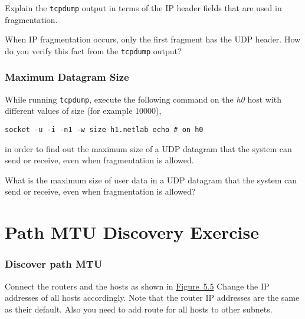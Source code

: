 \documentclass{../UTNetLab}
\begin{document}
    \begin{report}
        \item Explain the \lstinline{tcpdump} output in terms of the IP header fields that are used in fragmentation.

        \item When IP fragmentation occurs, only the first fragment has the UDP header.
    How do you verify this fact from the \lstinline{tcpdump} output?
    \end{report}


\section{Maximum Datagram Size}
\label{sec:MaxDatagramSize}
    While running \lstinline{tcpdump}, execute the following command on the \textit{h0} host with different values of size (for example 10000),
    \begin{lstlisting}[emph={size, h1,netlab},morekeywords={[3]echo}]
socket -u -i -n1 -w size h1.netlab echo # on h0
\end{lstlisting}
    in order to find out the maximum size of a UDP datagram that the system can send or receive, even when fragmentation is allowed.

    \begin{report}
        \item What is the maximum size of user data in a UDP datagram that the system can send or receive, even when fragmentation is allowed?
    \end{report}


\part{Path MTU Discovery Exercise}\label{sec:PMTUD}

\section{Discover path MTU}
    Connect the routers and the hosts as shown in \hyperref[fig:5.5]{Figure~5.5} Change the IP addresses of all hosts accordingly.
    Note that the router IP addresses are the same as their default.
    Also you need to add route for all hosts to other subnets.

\end{document}
